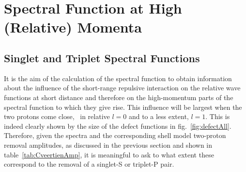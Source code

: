 \section{Spectral Function at High (Relative) Momenta\label{sec:specfunc}}
\subsection{Singlet and Triplet Spectral Functions}
It is the aim of the calculation of the spectral function to obtain 
information about the influence of the short-range repulsive interaction on 
the relative wave functions at short distance and therefore on the  
high-momentum parts of the spectral function to which they give rise. 
This influence will be largest when the two protons come close, 
\ie\ in relative $l=0$ and to a less extent, $l=1$. This is indeed clearly 
shown by the size of the defect functions in fig.~\ref{fig:defectAll}. 
Therefore, given the spectra and the corresponding shell model two-proton 
removal amplitudes, as discussed in the previous section and shown in 
table~\ref{tab:CveertienAmp}, it is meaningful to ask to what extent these 
correspond to the removal of a singlet-S or triplet-P pair.


